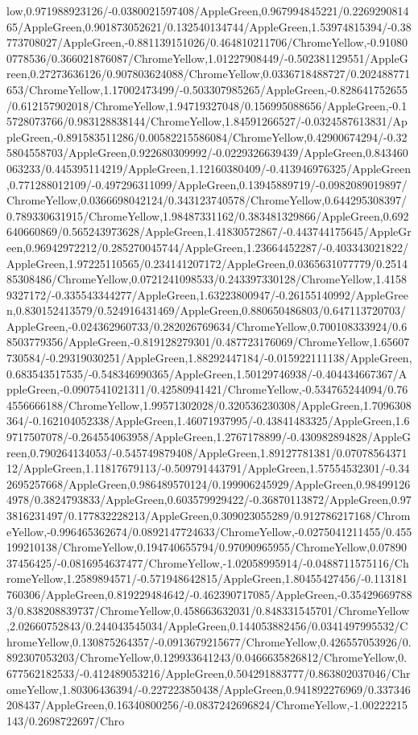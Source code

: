 {\begin{tikzternal}
low,0.971988923126/-0.0380021597408/AppleGreen,0.967994845221/0.226929081465/AppleGreen,0.901873052621/0.132540134744/AppleGreen,1.53974815394/-0.38773708027/AppleGreen,-0.881139151026/0.464810211706/ChromeYellow,-0.910800778536/0.366021876087/ChromeYellow,1.01227908449/-0.502381129551/AppleGreen,0.27273636126/0.907803624088/ChromeYellow,0.0336718488727/0.202488771653/ChromeYellow,1.17002473499/-0.503307985265/AppleGreen,-0.828641752655/0.612157902018/ChromeYellow,1.94719327048/0.156995088656/AppleGreen,-0.15728073766/0.983128838144/ChromeYellow,1.84591266527/-0.0324587613831/AppleGreen,-0.891583511286/0.00582215586084/ChromeYellow,0.42900674294/-0.325804558703/AppleGreen,0.922680309992/-0.0229326639439/AppleGreen,0.843460063233/0.445395114219/AppleGreen,1.12160380409/-0.413946976325/AppleGreen,0.771288012109/-0.497296311099/AppleGreen,0.13945889719/-0.0982089019897/ChromeYellow,0.0366698042124/0.343123740578/ChromeYellow,0.644295308397/0.789330631915/ChromeYellow,1.98487331162/0.383481329866/AppleGreen,0.692640660869/0.565243973628/AppleGreen,1.41830572867/-0.443744175645/AppleGreen,0.96942972212/0.285270045744/AppleGreen,1.23664452287/-0.403343021822/AppleGreen,1.97225110565/0.234141207172/AppleGreen,0.0365631077779/0.251485308486/ChromeYellow,0.0721241098533/0.243397330128/ChromeYellow,1.41589327172/-0.335543344277/AppleGreen,1.63223800947/-0.26155140992/AppleGreen,0.830152413579/0.524916431469/AppleGreen,0.880650486803/0.647113720703/AppleGreen,-0.024362960733/0.282026769634/ChromeYellow,0.700108333924/0.68503779356/AppleGreen,-0.819128279301/0.487723176069/ChromeYellow,1.65607730584/-0.29319030251/AppleGreen,1.88292447184/-0.015922111138/AppleGreen,0.683543517535/-0.548346990365/AppleGreen,1.50129746938/-0.404434667367/AppleGreen,-0.0907541021311/0.42580941421/ChromeYellow,-0.534765244094/0.764556666188/ChromeYellow,1.99571302028/0.320536230308/AppleGreen,1.7096308364/-0.162104052338/AppleGreen,1.46071937995/-0.43841483325/AppleGreen,1.69717507078/-0.264554063958/AppleGreen,1.2767178899/-0.430982894828/AppleGreen,0.790264134053/-0.545749879408/AppleGreen,1.89127781381/0.0707856437112/AppleGreen,1.11817679113/-0.509791443791/AppleGreen,1.57554532301/-0.342695257668/AppleGreen,0.986489570124/0.199906245929/AppleGreen,0.984991264978/0.3824793833/AppleGreen,0.603579929422/-0.36870113872/AppleGreen,0.973816231497/0.177832228213/AppleGreen,0.309023055289/0.912786217168/ChromeYellow,-0.996465362674/0.0892147724633/ChromeYellow,-0.0275041211455/0.455199210138/ChromeYellow,0.194740655794/0.97090965955/ChromeYellow,0.0789037456425/-0.0816954637477/ChromeYellow,-1.02058995914/-0.0488711575116/ChromeYellow,1.2589894571/-0.571948642815/AppleGreen,1.80455427456/-0.113181760306/AppleGreen,0.819229484642/-0.462390717085/AppleGreen,-0.354296697883/0.838208839737/ChromeYellow,0.458663632031/0.848331545701/ChromeYellow,2.02660752843/0.244043545034/AppleGreen,0.144053882456/0.0341497995532/ChromeYellow,0.130875264357/-0.0913679215677/ChromeYellow,0.426557053926/0.892307053203/ChromeYellow,0.129933641243/0.0466635826812/ChromeYellow,0.677562182533/-0.412489053216/AppleGreen,0.504291883777/0.863802037046/ChromeYellow,1.80306436394/-0.227223850438/AppleGreen,0.941892276969/0.337346208437/AppleGreen,0.16340800256/-0.0837242696824/ChromeYellow,-1.00222215143/0.2698722697/Chro
\end{tikzternal}}
